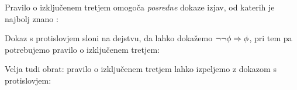 Pravilo o izključenem tretjem omogoča \emph{posredne} dokaze izjav, od
katerih je najbolj znano :
%
\begin{boxDisplay}
  \begin{boxedProof}
    \begin{boxFrame}
    \end{boxFrame}
  \end{boxedProof}
\end{boxDisplay}
%
Dokaz s protislovjem sloni na dejstvu, da lahko dokažemo $\neg\neg\phi \Rightarrow \phi$, pri tem pa potrebujemo pravilo o izključenem tretjem:
%
\begin{boxDisplay}
  \begin{boxedProof}[numbered]
    \begin{boxFrame}
      \begin{boxNested}[2]
      \end{boxNested}
      \begin{boxNested}[2]
      \end{boxNested}
    \end{boxFrame}
  \end{boxedProof}
\end{boxDisplay}
%
Velja tudi obrat: pravilo o izključenem tretjem lahko izpeljemo z dokazom s protislovjem:
%
